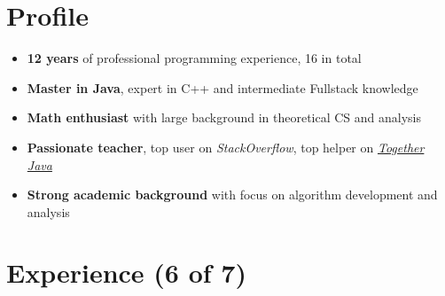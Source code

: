 \documentclass[letterpaper]{twentysecondcv} %
\begin{document}
\makesidebarFirst %

\section{Profile}

\begin{itemize}
	\item \textbf{12 years} of professional programming experience, 16 in total
	\item \textbf{Master in Java}, expert in C++ and intermediate Fullstack knowledge
	\item \textbf{Math enthusiast} with large background in theoretical CS and analysis
	\item \textbf{Passionate teacher}, top user on \textit{StackOverflow}, top helper on \textit{\href{https://togetherjava.duckdns.org/}{Together Java}}
	\item \textbf{Strong academic background} with focus on algorithm development and analysis
\end{itemize}

\vspace{6mm}


\section{Experience (6 of 7)}
\end{document}
